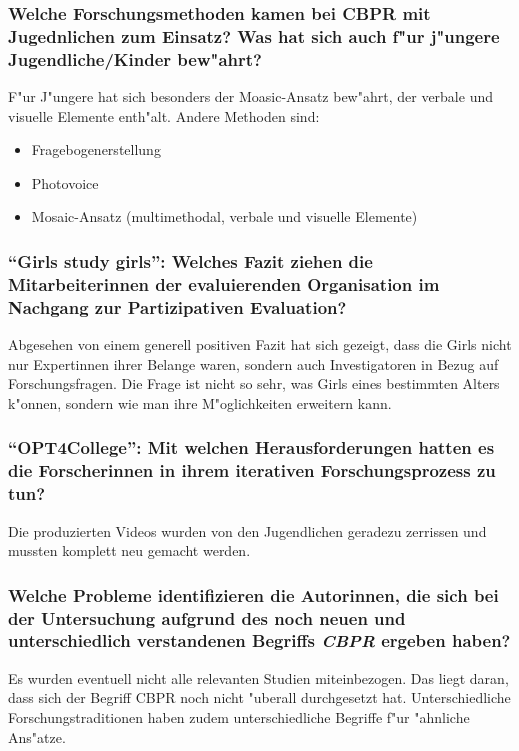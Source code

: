 \subsubsection{Welche Forschungsmethoden kamen bei CBPR mit Jugednlichen zum Einsatz? Was hat sich auch f"ur j"ungere Jugendliche/Kinder bew"ahrt?}
F"ur J"ungere hat sich besonders der Moasic-Ansatz bew"ahrt, der verbale und visuelle Elemente enth"alt. Andere Methoden sind:
\begin{itemize}
        \item Fragebogenerstellung
        \item Photovoice
        \item Mosaic-Ansatz (multimethodal, verbale und visuelle Elemente)
\end{itemize}

\subsubsection{``Girls study girls'': Welches Fazit ziehen die Mitarbeiterinnen der evaluierenden Organisation im Nachgang zur Partizipativen Evaluation?}
Abgesehen von einem generell positiven Fazit hat sich gezeigt, dass die Girls nicht nur Expertinnen ihrer Belange waren, sondern auch Investigatoren in Bezug  auf Forschungsfragen. Die Frage ist nicht so sehr, was Girls eines bestimmten Alters k"onnen, sondern wie man ihre M"oglichkeiten erweitern kann. 

\subsubsection{``OPT4College'': Mit welchen Herausforderungen hatten es die Forscherinnen in ihrem iterativen Forschungsprozess zu tun?}
Die produzierten Videos wurden von den Jugendlichen geradezu zerrissen und mussten komplett neu gemacht werden.

\subsubsection{Welche Probleme identifizieren die Autorinnen, die sich bei der Untersuchung aufgrund des noch neuen und unterschiedlich verstandenen Begriffs \emph{CBPR} ergeben haben?}
Es wurden eventuell nicht alle relevanten Studien miteinbezogen. Das liegt daran, dass sich der Begriff CBPR noch nicht "uberall durchgesetzt hat. Unterschiedliche Forschungstraditionen haben zudem unterschiedliche Begriffe f"ur "ahnliche Ans"atze.


